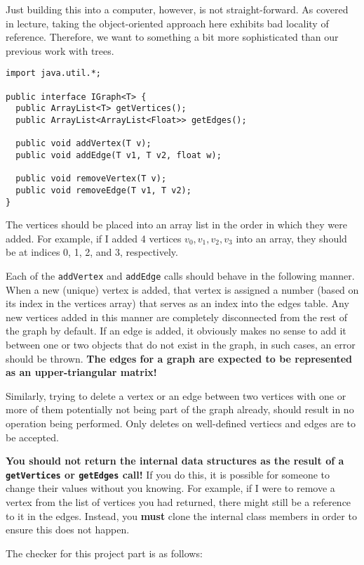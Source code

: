 \documentclass{article}
\begin{document}
Just building this into a computer, however, is not straight-forward.  As
covered in lecture, taking the object-oriented approach here exhibits bad
locality of reference.  Therefore, we want to something a bit more
sophisticated than our previous work with trees.

\begin{verbatim}
import java.util.*;

public interface IGraph<T> {
  public ArrayList<T> getVertices();
  public ArrayList<ArrayList<Float>> getEdges();

  public void addVertex(T v);
  public void addEdge(T v1, T v2, float w);

  public void removeVertex(T v);
  public void removeEdge(T v1, T v2);
}
\end{verbatim}

The vertices should be placed into an array list in the order in which they
were added.  For example, if I added 4 vertices $v_0, v_1, v_2, v_3$ into an
array, they should be at indices 0, 1, 2, and 3, respectively.

Each of the \texttt{addVertex} and \texttt{addEdge} calls should behave in the
following manner.  When a new (unique) vertex is added, that vertex is assigned
a number (based on its index in the vertices array) that serves as an index
into the edges table.  Any new vertices added in this manner are completely
disconnected from the rest of the graph by default.  If an edge is added, it
obviously makes no sense to add it between one or two objects that do not exist
in the graph, in such cases, an error should be thrown.  {\bf The edges for a
graph are expected to be represented as an upper-triangular matrix!}

Similarly, trying to delete a vertex or an edge between two vertices with one
or more of them potentially not being part of the graph already, should result
in no operation being performed.  Only deletes on well-defined vertiecs and
edges are to be accepted.

{\bf You should not return the internal data structures as the result of a
\texttt{getVertices} or \texttt{getEdges} call!}  If you do this, it is
possible for someone to change their values without you knowing.  For example,
if I were to remove a vertex from the list of vertices you had returned, there
might still be a reference to it in the edges.  Instead, you {\bf must} clone
the internal class members in order to ensure this does not happen.

The checker for this project part is as follows:
\end{document}
